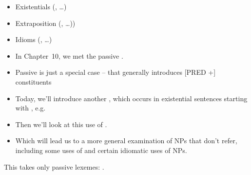 \documentclass[a4paper,landscape,headrule,footrule]{foils}
\begin{document}
\maketitle





\begin{itemize}
\item Existentials  (, \ldots)
\item Extraposition (, \ldots))
\item Idioms (, \ldots)
\end{itemize}



\begin{itemize}
\item In Chapter~10, we met the passive .
\item Passive  is just a special case -- that 
generally introduces [PRED +] constituents 
\item Today, we’ll introduce another , which 
occurs in existential sentences starting with 
, e.g. 
\item Then we’ll look at this use of .
\item Which will lead us to a more general 
examination of NPs that don’t refer, including 
some uses of  and certain idiomatic uses of 
NPs.
\end{itemize}





This takes only passive lexemes: .
\end{document}
